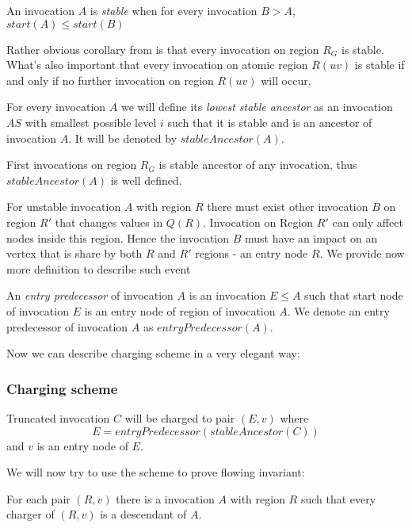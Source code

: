 \begin{defn}
An invocation $A$ is \emph{stable} when for every invocation $B > A$, $start(A) \leq start(B)$
\end{defn}

Rather obvious corollary from  is that every invocation on region $R_G$ is stable. What's also important that every invocation on atomic region $R(u v)$ is stable if and only if no further invocation on region $R(u v)$ will occur.

\begin{defn}
For every invocation $A$ we will define its \emph{lowest stable ancestor} as an invocation $AS$ with smallest possible level $i$ such that it is stable and is an ancestor of invocation $A$. It will be denoted by $stableAncestor(A)$.
\end{defn}

First invocations on region $R_G$ is stable ancestor of any invocation, thus $stableAncestor(A)$ is well defined.

For unstable invocation $A$ with region $R$ there must exist other invocation $B$ on region $R'$ that changes values in $Q(R)$. Invocation on Region $R'$ can only affect nodes inside this region. Hence the invocation $B$ must have an impact on an vertex that is share by both $R$ and $R'$ regions - an entry node $R$. We provide now more definition to describe such event

\begin{defn}
An \emph{entry predecessor} of invocation $A$ is an invocation $E \leq A$ such that start node of invocation $E$ is an entry node of region of invocation $A$. We denote an entry predecessor of invocation $A$ as $entryPredecessor(A)$.
\end{defn}

Now we can describe charging scheme in a very elegant way:

\subsubsection{Charging scheme}
Truncated invocation $C$ will be charged to pair $(E, v)$ where $$E = entryPredecessor(stableAncestor(C))$$ and $v$ is an entry node of $E$.

We will now try to use the scheme to prove flowing invariant:
\begin{lemma}
\label{invariant}
For each pair $(R, v)$ there is a invocation $A$ with region $R$ such that every charger of $(R, v)$ is a descendant of $A$.
\end{lemma}

